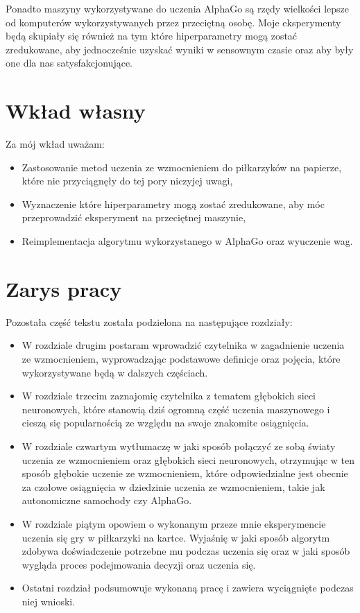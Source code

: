 \documentclass[licencjacka]{pracamgr}
\begin{document}
Ponadto maszyny wykorzystywane do uczenia AlphaGo są rzędy wielkości lepsze od komputerów wykorzystywanych przez przeciętną osobę. Moje eksperymenty będą skupiały się również na tym które hiperparametry mogą zostać zredukowane, aby jednocześnie uzyskać wyniki w sensownym czasie oraz aby były one dla nas satysfakcjonujące.


\section{Wkład własny}

Za mój wkład uważam:

\begin{itemize}

\item Zastosowanie metod uczenia ze wzmocnieniem do piłkarzyków na papierze, które nie przyciągnęły do tej pory niczyjej uwagi,

\item Wyznaczenie które hiperparametry mogą zostać zredukowane, aby móc przeprowadzić eksperyment na przeciętnej maszynie,

\item Reimplementacja algorytmu wykorzystanego w AlphaGo oraz wyuczenie wag.

\end{itemize}

\section{Zarys pracy}

Pozostała część tekstu została podzielona na następujące rozdziały:
\begin{itemize}

\item W rozdziale drugim postaram wprowadzić czytelnika w zagadnienie uczenia ze wzmocnieniem, wyprowadzając podstawowe definicje oraz pojęcia, które wykorzystywane będą w dalszych częściach.

\item W rozdziale trzecim zaznajomię czytelnika z tematem głębokich sieci neuronowych, które stanowią dziś ogromną część uczenia maszynowego i cieszą się popularnością ze względu na swoje znakomite osiągnięcia.

\item W rozdziale czwartym wytłumaczę w jaki sposób połączyć ze sobą światy uczenia ze wzmocnieniem oraz głębokich sieci neuronowych, otrzymując w ten sposób głębokie uczenie ze wzmocnieniem, które odpowiedzialne jest obecnie za czołowe osiągnięcia w dziedzinie uczenia ze wzmocnieniem, takie jak autonomiczne samochody czy AlphaGo.

\item W rozdziale piątym opowiem o wykonanym przeze mnie eksperymencie uczenia się gry w piłkarzyki na kartce. Wyjaśnię w jaki sposób algorytm zdobywa doświadczenie potrzebne mu podczas uczenia się oraz w jaki sposób wygląda proces podejmowania decyzji oraz uczenia się.

\item Ostatni rozdział podsumowuje wykonaną pracę i zawiera wyciągnięte podczas niej wnioski.
\end{itemize}
 
\end{document}
